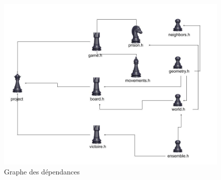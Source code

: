 \documentclass[a4paper]{article}
\begin{document}
\begin{figure}
  \includegraphics[width=\linewidth]{Dessin sans titre.jpg}
  \caption{Graphe des dépendances}
  \label{fig:length_eight_mouse}
\end{figure}
\end{document}
